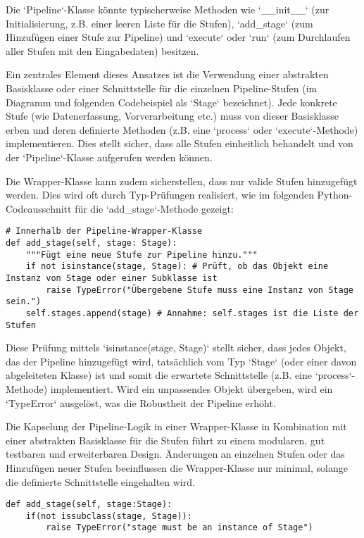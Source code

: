 \documentclass[11pt, a4paper]{article}
\begin{document}
Die `Pipeline`-Klasse könnte typischerweise Methoden wie `\_\_init\_\_` (zur Initialisierung, z.B. einer leeren Liste für die Stufen), `add\_stage` (zum Hinzufügen einer Stufe zur Pipeline) und `execute` oder `run` (zum Durchlaufen aller Stufen mit den Eingabedaten) besitzen.

Ein zentrales Element dieses Ansatzes ist die Verwendung einer abstrakten Basisklasse oder einer Schnittstelle für die einzelnen Pipeline-Stufen (im Diagramm und folgenden Codebeispiel als `Stage` bezeichnet). Jede konkrete Stufe (wie Datenerfassung, Vorverarbeitung etc.) muss von dieser Basisklasse erben und deren definierte Methoden (z.B. eine `process` oder `execute`-Methode) implementieren. Dies stellt sicher, dass alle Stufen einheitlich behandelt und von der `Pipeline`-Klasse aufgerufen werden können.

Die Wrapper-Klasse kann zudem sicherstellen, dass nur valide Stufen hinzugefügt werden. Dies wird oft durch Typ-Prüfungen realisiert, wie im folgenden Python-Codeausschnitt für die `add\_stage`-Methode gezeigt:

\begin{verbatim}
# Innerhalb der Pipeline-Wrapper-Klasse
def add_stage(self, stage: Stage):
    """Fügt eine neue Stufe zur Pipeline hinzu."""
    if not isinstance(stage, Stage): # Prüft, ob das Objekt eine Instanz von Stage oder einer Subklasse ist
        raise TypeError("Übergebene Stufe muss eine Instanz von Stage sein.")
    self.stages.append(stage) # Annahme: self.stages ist die Liste der Stufen
\end{verbatim}

Diese Prüfung mittels `isinstance(stage, Stage)` stellt sicher, dass jedes Objekt, das der Pipeline hinzugefügt wird, tatsächlich vom Typ `Stage` (oder einer davon abgeleiteten Klasse) ist und somit die erwartete Schnittstelle (z.B. eine `process`-Methode) implementiert. Wird ein unpassendes Objekt übergeben, wird ein `TypeError` ausgelöst, was die Robustheit der Pipeline erhöht.

Die Kapselung der Pipeline-Logik in einer Wrapper-Klasse in Kombination mit einer abstrakten Basisklasse für die Stufen führt zu einem modularen, gut testbaren und erweiterbaren Design. Änderungen an einzelnen Stufen oder das Hinzufügen neuer Stufen beeinflussen die Wrapper-Klasse nur minimal, solange die definierte Schnittstelle eingehalten wird.

\begin{verbatim}
def add_stage(self, stage:Stage):
    if(not issubclass(stage, Stage)):
        raise TypeError("stage must be an instance of Stage")
\end{verbatim}\
\end{document}
